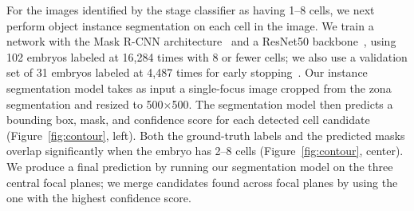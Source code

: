 
 For the images identified by the stage classifier as having 1--8 cells, we next perform object instance segmentation on each cell in the image. We train a network with the Mask R-CNN architecture~\cite{he2017mask} and a ResNet50 backbone~\cite{he2016deep}, using 102 embryos labeled at 16,284 times with 8 or fewer cells; we also use a validation set of 31 embryos labeled at 4,487 times for early stopping~\cite{goodfellow2016deep}. Our instance segmentation model takes as input a single-focus image cropped from the zona segmentation and resized to 500$\times$500. The segmentation model then predicts a bounding box, mask, and confidence score for each detected cell candidate (Figure~\ref{fig:contour}, left). Both the ground-truth labels and the predicted masks overlap significantly when the embryo has 2--8 cells (Figure~\ref{fig:contour}, center). We produce a final prediction by running our segmentation model on the three central focal planes; we merge candidates found across focal planes by using the one with the highest confidence score.

